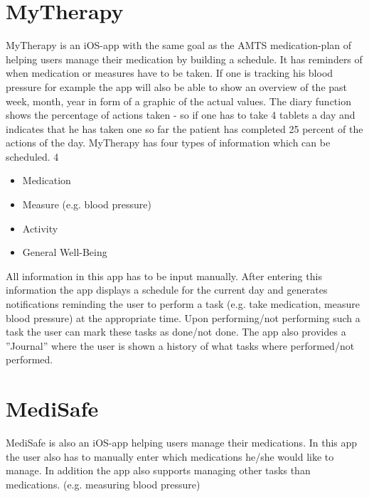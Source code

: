 \documentclass{article}
\begin{document}
\section{MyTherapy}
MyTherapy\citep{mytherapy} is an iOS-app with the same goal as the AMTS medication-plan of helping users manage their medication by building a schedule. It has reminders of when medication or measures have to be taken. If one is tracking his blood pressure for example the app will also be able to show an overview of the past week, month, year in form of a graphic of the actual values. The diary function shows the percentage of actions taken - so if one has to take 4 tablets a day and indicates that he has taken one so far the patient has completed 25 percent of the actions of the day.
MyTherapy has four types of information which can be scheduled. 4
\begin{itemize}
  \item
    Medication
  \item
    Measure (e.g. blood pressure)
  \item
    Activity
  \item
    General Well-Being
\end{itemize}
All information in this app has to be input manually. After entering this information the app displays a schedule for the current day and generates notifications reminding the user to perform a task (e.g. take medication, measure blood pressure) at the appropriate time. Upon performing/not performing such a task the user can mark these tasks as done/not done. The app also provides a ”Journal” where the user is shown a history of what tasks where performed/not performed.

\section{MediSafe}

MediSafe\citep{medisafe} is also an iOS-app helping users manage their medications. In this app the user also has to manually enter which medications he/she would like to manage. In addition the app also supports managing other tasks than medications. (e.g. measuring blood pressure)
\end{document}
